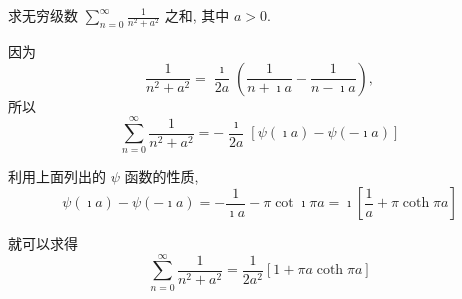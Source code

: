 \begin{example}
求无穷级数 $\sum_{n=0}^{\infty} \frac{1}{n^{2}+a^{2}}$ 之和, 其中 $a>0$.
\end{example}
\begin{solution}
因为
$$
\frac{1}{n^{2}+a^{2}}=\frac{\imath}{2 a}\left(\frac{1}{n+\imath a}-\frac{1}{n-\imath a}\right),
$$
所以
$$
\sum_{n=0}^{\infty} \frac{1}{n^{2}+a^{2}}=-\frac{\imath}{2 a}[\psi(\imath a)-\psi(-\imath a)]
$$

利用上面列出的 $\psi$ 函数的性质,
$$
\psi(\imath a)-\psi(-\imath a)=-\frac{1}{\imath a}-\pi \cot \imath \pi a=\imath\left[\frac{1}{a}+\pi \operatorname{coth} \pi a\right]
$$

就可以求得
$$
\sum_{n=0}^{\infty} \frac{1}{n^{2}+a^{2}}=\frac{1}{2 a^{2}}[1+\pi a \operatorname{coth} \pi a]
$$
\end{solution}